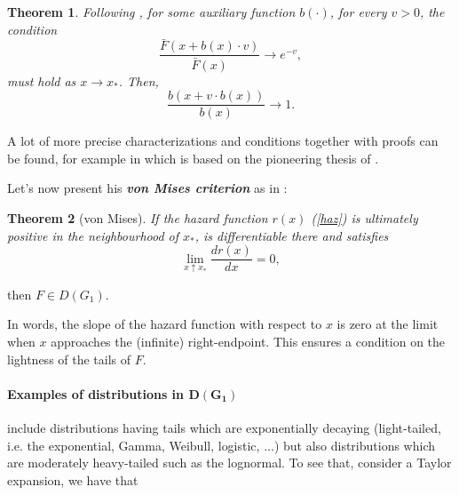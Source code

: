 \documentclass[11pt,a4paper,openany ]{book}
\newtheorem{theorem}{Theorem}[chapter]
\begin{document}
\begin{theorem} Following \cite[pp.72]{beirlant_statistics_2006},
	for some auxiliary function $b(\cdot )$, for every $v>0$, the condition
	\begin{equation}
	\frac{\bar{F}(x+b(x)\cdot v)}{\bar{F}(x)} \to e^{-v},
	\end{equation}
	must hold as $x\to x_*$. Then, 
	\begin{equation*}
	\frac{b(x+v\cdot b(x))}{b(x)}\to 1 .
	\end{equation*} 
\end{theorem}

A lot of more precise characterizations and conditions together with proofs can be found, for example in \citet[pp.20-33]{haan_extreme_2006} which is based on the pioneering thesis of \citet{haan_regular_1970-1}. 

Let's now present his \emph{\textbf{von Mises criterion}} as in \cite[pp.73]{beirlant_statistics_2006}: 

\begin{theorem}[von Mises] If the hazard function $r(x)$ (\ref{haz})
is ultimately positive in the neighbourhood of $x_*$, is differentiable there and satisfies 
\begin{equation}
\displaystyle{\lim_{x  \uparrow  x_*}} \frac{dr(x)}{dx}=0,
\end{equation}
\end{theorem}

then $F\in D(G_1)$. 

In words, the slope of the hazard function with respect to $x$ is zero at the limit when $x$ approaches the (infinite) right-endpoint. This ensures a condition on the lightness of the tails of $F$.

\paragraph*{Examples of distributions in $\boldsymbol{D(G_1)}$} include distributions having tails which are exponentially decaying (light-tailed, i.e. the exponential, Gamma, Weibull, logistic, $\dots$) but also distributions which are moderately heavy-tailed such as the lognormal.
To see that, consider a Taylor expansion, we have that 
\end{document}
